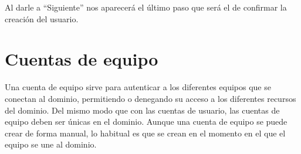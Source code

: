 Al darle a “Siguiente” nos aparecerá el último paso que será el de confirmar la creación del usuario.



\section{Cuentas de equipo}
Una cuenta de equipo sirve para autenticar a los diferentes equipos que se conectan al dominio, permitiendo o denegando su acceso a los diferentes recursos del dominio. Del mismo modo que con las cuentas de usuario, las cuentas de equipo deben ser únicas en el dominio. Aunque una cuenta de equipo se puede crear de forma manual, lo habitual es que se crean en el momento en el que el equipo se une al dominio.




